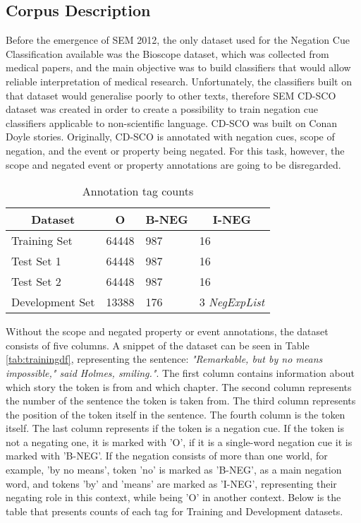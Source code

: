 
\subsection*{Corpus Description\label{sec:corpus_description}}
 
Before the emergence of SEM 2012, the only dataset used for the Negation Cue Classification available was the Bioscope dataset, which was collected from medical papers, and the main objective was to build classifiers that would allow reliable interpretation of medical research. Unfortunately, the classifiers built on that dataset would generalise poorly to other texts, therefore SEM CD-SCO dataset was created in order to create a possibility to train negation cue classifiers applicable to non-scientific language. CD-SCO was built on Conan Doyle stories. Originally, CD-SCO is annotated with negation cues, scope of negation, and the event or property being negated. For this task, however, the scope and negated event or property annotations are going to be disregarded.

\begin{table}
\centering
\begin{tabular}{llll}
\multicolumn{1}{c}{\textbf{Dataset}} & \multicolumn{1}{c}{\textbf{O}} & \multicolumn{1}{c}{\textbf{B-NEG}} & \multicolumn{1}{c}{\textbf{I-NEG}}                                                                                            \\ 
\hline\hline
Training Set & 64448 & 987 & 16\\
Test Set 1 & 64448 & 987 & 16\\
Test Set 2 & 64448 & 987 & 16\\
Development Set & 13388 & 176 & 3
\textit{NegExpList}\\
\hline
\end{tabular}
\caption{\label{tab:tags} Annotation tag counts}
\end{table}


Without the scope and negated property or event annotations, the dataset consists of five columns. A snippet of the dataset can be seen in Table \ref{tab:trainingdf}, representing the sentence: \textit{"Remarkable, but by no means impossible," said Holmes, smiling."}. The first column contains information about which story the token is from and which chapter. The second column represents the number of the sentence the token is taken from. The third column represents the position of the token itself in the sentence. The fourth column is the token itself. The last column represents if the token is a negation cue. If the token is not a negating one, it is marked with 'O', if it is a single-word negation cue it is marked with 'B-NEG'. If the negation consists of more than one world, for example, 'by no means', token 'no' is marked as 'B-NEG', as a main negation word, and tokens 'by' and 'means' are marked as 'I-NEG', representing their negating role in this context, while being 'O' in another context. Below is the table that presents counts of each tag for Training and Development datasets.

